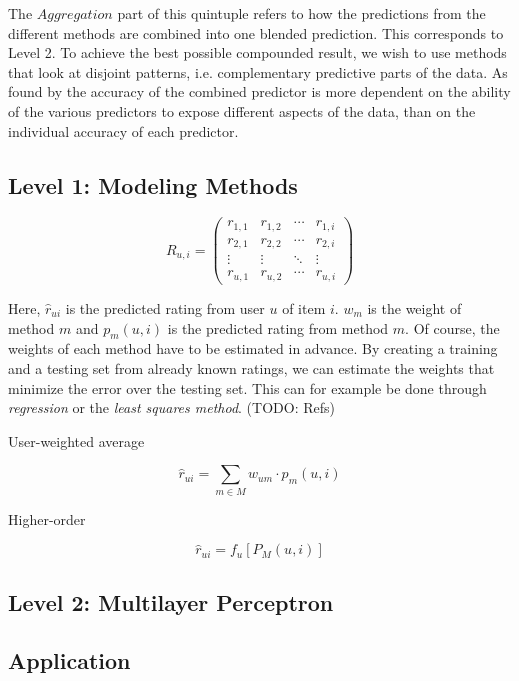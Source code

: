 The $Aggregation$ part of this quintuple refers to how the predictions from the different methods are combined
into one blended prediction. 
This corresponds to Level 2.
To achieve the best possible compounded result, we wish to use methods that look at disjoint patterns, 
i.e. complementary predictive parts of the data.
As found by \citet[p6]{Bell2007} the accuracy of the combined predictor is more dependent on the 
ability of the various predictors to expose different aspects of the data, than on 
the individual accuracy of each predictor.



\subsection{Level 1: Modeling Methods}

\begin{equation*}
 R_{u,i} =
 \begin{pmatrix}
  r_{1,1} & r_{1,2} & \cdots & r_{1,i} \\
  r_{2,1} & r_{2,2} & \cdots & r_{2,i} \\
  \vdots  & \vdots  & \ddots & \vdots  \\
  r_{u,1} & r_{u,2} & \cdots & r_{u,i}
 \end{pmatrix}
\end{equation*}

Here, $\hat{r}_{ui}$ is the predicted rating from user $u$ of item $i$.
$w_m$ is the weight of method $m$ and $p_m(u,i)$ is the predicted rating from method $m$.
Of course, the weights of each method have to be estimated in advance.
By creating a training and a testing set from already known ratings, we can estimate the weights
that minimize the error over the testing set. 
This can for example be done through \emph{regression} or the \emph{least squares method}.
(TODO: Refs)

User-weighted average

\begin{equation*}
  \hat{r}_{ui} = \sum_{m \in M} w_{um} \cdot p_m(u,i)
\end{equation*}


Higher-order

\begin{equation*}
  \hat{r}_{ui} = f_{u}[ P_{M}(u,i) ]
\end{equation*}


\subsection{Level 2: Multilayer Perceptron}

\subsection{Application}



